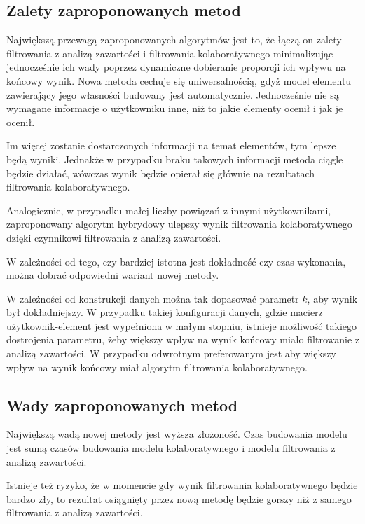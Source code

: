 \documentclass[twoside]{iisthesis}
\begin{document}
		 \subsection{Zalety zaproponowanych metod}
		 
		 Największą przewagą zaproponowanych algorytmów jest to, że łączą on zalety filtrowania z analizą zawartości i filtrowania kolaboratywnego minimalizując jednocześnie ich wady poprzez dynamiczne dobieranie proporcji ich wpływu na końcowy wynik. Nowa metoda cechuje się uniwersalnością, gdyż model elementu zawierający jego własności budowany jest automatycznie. Jednocześnie nie są wymagane informacje o użytkowniku inne, niż to jakie elementy ocenił i jak je ocenił. 
		 
		 Im więcej zostanie dostarczonych informacji na temat elementów, tym lepsze będą wyniki. Jednakże w przypadku braku takowych informacji metoda ciągle będzie działać,  wówczas wynik będzie opierał się głównie na rezultatach filtrowania kolaboratywnego.
		 
		 Analogicznie, w przypadku małej liczby powiązań z innymi użytkownikami, zaproponowany algorytm hybrydowy ulepszy wynik filtrowania kolaboratywnego dzięki czynnikowi filtrowania z analizą zawartości. 
		 
		 W zależności od tego, czy bardziej istotna jest dokładność czy czas wykonania, można dobrać odpowiedni wariant nowej metody. 
		 
		 W zależności od konstrukcji danych można tak dopasować parametr $k$, aby wynik był dokładniejszy. W przypadku takiej konfiguracji danych, gdzie macierz użytkownik-element jest wypełniona w małym stopniu, istnieje możliwość takiego dostrojenia parametru, żeby większy wpływ na wynik końcowy miało filtrowanie z analizą zawartości. W przypadku odwrotnym preferowanym jest aby większy wpływ na wynik końcowy miał algorytm filtrowania kolaboratywnego.
		 
		 \subsection{Wady zaproponowanych metod}
		 
		 Największą wadą nowej metody jest wyższa złożoność. Czas budowania modelu jest sumą czasów budowania modelu kolaboratywnego i modelu filtrowania z analizą zawartości. 
		 
		 Istnieje też ryzyko, że w momencie gdy wynik filtrowania kolaboratywnego będzie bardzo zły, to rezultat osiągnięty przez nową metodę będzie gorszy niż z samego filtrowania z analizą zawartości. 
		 
\end{document}
